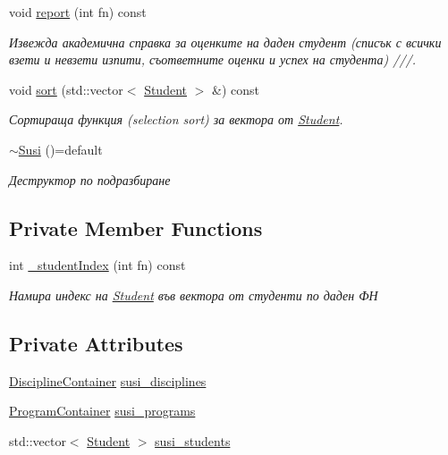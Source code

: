 \begin{DoxyCompactItemize}
void \hyperlink{class_susi_a6511521c7645dc43a080c5921f037d8f}{report} (int fn) const
\begin{DoxyCompactList}\small\item\em Извежда академична справка за оценките на даден студент (списък с всички взети и невзети изпити, съответните оценки и успех на студента) ///. \end{DoxyCompactList}\item 
void \hyperlink{class_susi_a98cf9bfd27148f4a3c108ff5dcc0dd25}{sort} (std\+::vector$<$ \hyperlink{class_student}{Student} $>$ \&) const
\begin{DoxyCompactList}\small\item\em Сортираща функция (selection sort) за вектора от \hyperlink{class_student}{Student}. \end{DoxyCompactList}\item 
\hyperlink{class_susi_ae91ce62ca3142f9f7f7c77749b0df03e}{$\sim$\+Susi} ()=default
\begin{DoxyCompactList}\small\item\em Деструктор по подразбиране \end{DoxyCompactList}\end{DoxyCompactItemize}
\subsection*{Private Member Functions}
\begin{DoxyCompactItemize}
\item 
int \hyperlink{class_susi_a2c1e25d57c4cf29149803a4d86c8e585}{\+\_\+student\+Index} (int fn) const
\begin{DoxyCompactList}\small\item\em Намира индекс на \hyperlink{class_student}{Student} във вектора от студенти по даден ФН \end{DoxyCompactList}\end{DoxyCompactItemize}
\subsection*{Private Attributes}
\begin{DoxyCompactItemize}
\item 
\hyperlink{class_discipline_container}{Discipline\+Container} \hyperlink{class_susi_a565e54b3a964048eeeb0fc08db29a483}{susi\+\_\+disciplines}
\item 
\hyperlink{class_program_container}{Program\+Container} \hyperlink{class_susi_ae443169a57ca8f5a02cedbd857160cc4}{susi\+\_\+programs}
\item 
std\+::vector$<$ \hyperlink{class_student}{Student} $>$ \hyperlink{class_susi_a01120305c1d7fac67fc79a026d9579ba}{susi\+\_\+students}
\end{DoxyCompactItemize}
